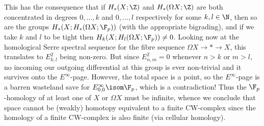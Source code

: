 \begin{solution}
	This has the consequence that if $H_*(X; \Z)$ and $H_*(\Omega X; \Z)$ are both concentrated in degrees $0, \ldots, k$ and $0, \ldots, l$ respectively for some $k, l \in \N$, then so are the groups $H_*(X; H_*(\Omega X; \F_p))$ (with the appropriate bigrading), and if we take $k$ and $l$ to be tight then $H_k(X; H_l(\Omega X; \F_p)) \neq 0$.
	Looking now at the homological Serre spectral sequence for the fibre sequence $\Omega X \to * \to X$, this translates to $E^2_{k, l}$ being non-zero.
	But since $E^2_{n, m} = 0$ whenever $n > k$ or $m > l$, no incoming our outgoing differential at this group is ever non-trivial and it survives onto the $E^\infty$-page.
	However, the total space is a point, so the $E^\infty$-page is a barren wasteland save for $E^\infty_{0, 0} \isom \F_p$, which is a contradiction!
	Thus the $\F_p$-homology of at least one of $X$ or $\Omega X$ must be infinite, whence we conclude that space cannot be (weakly) homotopy equivalent to a finite CW-complex since the homology of a finite CW-complex is also finite (via cellular homology).
\end{solution}

